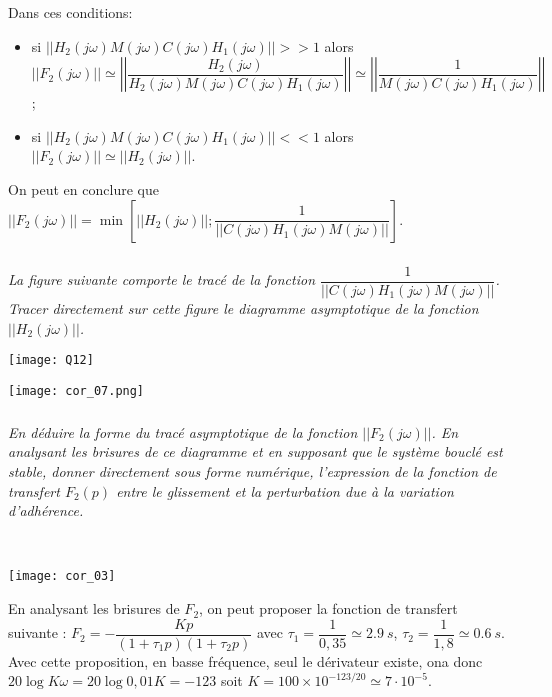 \begin{multicols}{2}
\begin{corrige}
Dans ces conditions: 
\begin{itemize} 
\item si $\left|\left|{H_2(j\omega)M(j\omega)C(j\omega)H_1(j\omega)}\right|\right|>>1$ alors  $||F_2(j\omega)||\simeq \left|\left|\dfrac{H_2(j\omega)}{H_2(j\omega)M(j\omega)C(j\omega)H_1(j\omega)}\right|\right|\simeq \left|\left|\dfrac{1}{M(j\omega)C(j\omega)H_1(j\omega)}\right|\right|$;
\item si $\left|\left|{H_2(j\omega)M(j\omega)C(j\omega)H_1(j\omega)}\right|\right|<<1$ alors  $||F_2(j\omega)||\simeq \left|\left|{H_2(j\omega)}\right|\right|$.
\end{itemize}

On peut en conclure que $||F_2(j \omega)|| = \min \left[ ||H_2(j \omega) || ; \dfrac{1}{||C(j\omega) H_1(j \omega) M(j\omega)||}\right]$.
\end{corrige}
\else
\fi




\subparagraph{}\textit{La figure suivante comporte le tracé de la fonction $\dfrac{1}{||C(j\omega) H_1(j \omega) M(j\omega)||}$. Tracer
directement sur cette figure le diagramme asymptotique de la fonction $||H_2(j \omega) ||$.}
\ifprof
\else
\begin{center}
\texttt{[image: Q12]}
\end{center}
\fi

\ifprof
\begin{corrige}
\begin{center}
\texttt{[image: cor\_07.png]}
\end{center}
\end{corrige}
\else
\fi



\subparagraph{}\textit{En déduire la forme du tracé asymptotique de la fonction $||F_2(j \omega) ||$. En analysant
les brisures de ce diagramme et en supposant que le système bouclé est
stable, donner directement sous forme numérique, l’expression de la fonction de
transfert $F_2(p)$ entre le glissement et la perturbation due à la
variation d’adhérence.}
\ifprof
\begin{corrige} ~\\
\begin{center}
\texttt{[image: cor\_03]}
\end{center}

En analysant les brisures de $F_2$, on peut proposer la fonction de transfert suivante : 
$F_2 = -\dfrac{Kp}{\left(1+\tau_1 p\right)\left(1+\tau_2 p\right)}$ avec $\tau_1 = \dfrac{1}{0,35}\simeq \SI{2,9}{s}$, $\tau_2 = \dfrac{1}{1,8}\simeq \SI{0,6}{s}$. Avec cette proposition, en basse fréquence, seul le dérivateur existe, ona donc  $20 \log K\omega =20\log  0,01K = -123$ soit $K = 100\times 10 ^{-123/20}\simeq 7 \cdot 10^{-5}$. 


\end{corrige}
\end{multicols}
